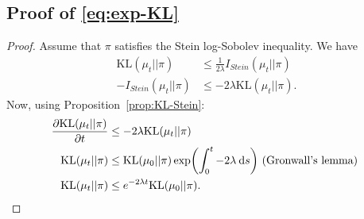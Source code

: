 \documentclass{article}
\newcommand{\KL}{\mathrm{KL}}
\newcommand{\diff}[2]{\frac{\partial #1}{\partial #2}}
\renewcommand{\d}{\: \mathrm{d}}
\DeclarePairedDelimiter{\pare}{(}{)}
\begin{document}
\subsection{Proof of \eqref{eq:exp-KL}}\label{pro:exp-KL}
\begin{proof}
  Assume that $\pi$ satisfies the Stein log-Sobolev inequality.
  We have
  \begin{align*}
    \KL(\mu_t || \pi) &\leq \frac{1}{2\lambda} I_{Stein}(\mu_t || \pi)\\
    -I_{Stein}(\mu_t || \pi) &\leq -2\lambda \KL(\mu_t || \pi).
  \end{align*}
  Now, using Proposition~\ref{prop:KL-Stein}:
  \begin{align*}
    \diff{\KL(\mu_t || \pi)}{t} &\leq -2\lambda \KL(\mu_t || \pi) \\
    \KL(\mu_t || \pi) &\leq \KL(\mu_0 || \pi) \exp \pare*{ \int_0^t -2 \lambda \d s }
    \text{ (Gronwall's lemma) } \\
    \KL(\mu_t || \pi) &\leq e^{-2\lambda t} \KL(\mu_0 || \pi).
  \end{align*}
    
\end{proof}
\end{document}
